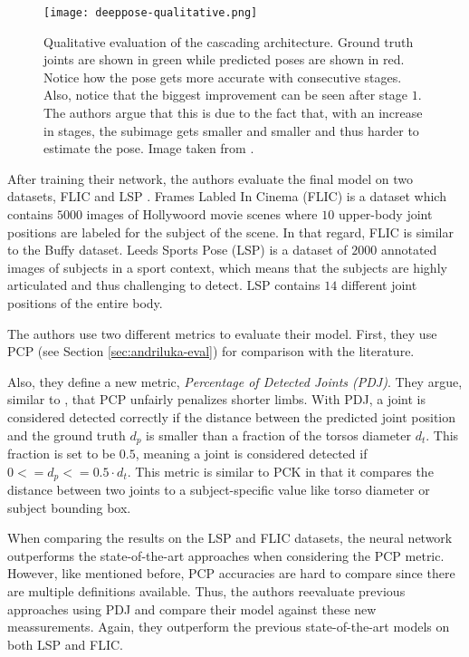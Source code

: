 \begin{figure}[htb!]
    \centering
    \texttt{[image: deeppose-qualitative.png]}
    \caption{Qualitative evaluation of the cascading architecture. Ground truth joints are shown in green while predicted poses are shown in red. Notice how the pose gets more accurate with consecutive stages. Also, notice that the biggest improvement can be seen after stage $1$. The authors argue that this is due to the fact that, with an increase in stages, the subimage gets smaller and smaller and thus harder to estimate the pose. Image taken from \cite{toshev_deeppose:_2014}.}
    \label{fig:deeppose-qualitative}
\end{figure}

\label{sec:flic-lsp}
After training their network, the authors evaluate the final model on two datasets, FLIC \cite{sapp_modec:_2013} and LSP \cite{johnson_clustered_2010}.
Frames Labled In Cinema (FLIC) is a dataset which contains $5000$ images of Hollywoord movie scenes where $10$ upper-body joint positions are labeled for the subject of the scene.
In that regard, FLIC is similar to the Buffy dataset.
Leeds Sports Pose (LSP) is a dataset of $2000$ annotated images of subjects in a sport context, which means that the subjects are highly articulated and thus challenging to detect.
LSP contains $14$ different joint positions of the entire body.

The authors use two different metrics to evaluate their model.
First, they use PCP (see Section \ref{sec:andriluka-eval}) for comparison with the literature.

Also, they define a new metric, \textit{Percentage of Detected Joints (PDJ)}.
They argue, similar to \cite{yang_articulated_2013}, that PCP unfairly penalizes shorter limbs.
With PDJ, a joint is considered detected correctly if the distance between the predicted joint position and the ground truth $d_p$ is smaller than a fraction of the torsos diameter $d_t$.
This fraction is set to be $0.5$, meaning a joint is considered detected if $0 <= d_p <= 0.5 \cdot d_t$.
This metric is similar to PCK in that it compares the distance between two joints to a subject-specific value like torso diameter or subject bounding box.

When comparing the results on the LSP and FLIC datasets, the neural network outperforms the state-of-the-art approaches when considering the PCP metric.
However, like mentioned before, PCP accuracies are hard to compare since there are multiple definitions available.
Thus, the authors reevaluate previous approaches using PDJ and compare their model against these new meassurements.
Again, they outperform the previous state-of-the-art models on both LSP and FLIC.

